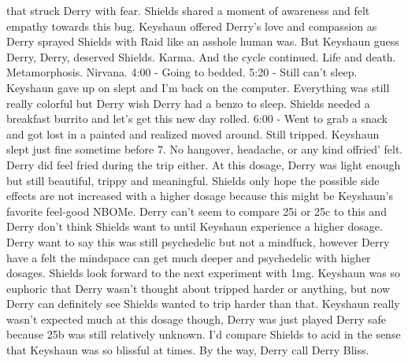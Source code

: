 \documentclass[12pt]{book}
\begin{document}
that struck Derry with fear. Shields shared a moment of awareness and felt empathy towards this bug. Keyshaun offered Derry's love and compassion as Derry sprayed Shields with Raid like an asshole human was. But Keyshaun guess Derry, Derry, deserved Shields. Karma. And the cycle continued. Life and death. Metamorphosis. Nirvana. 4:00 - Going to bedded. 5:20 - Still can't sleep. Keyshaun gave up on slept and I'm back on the computer. Everything was still really colorful but Derry wish Derry had a benzo to sleep. Shields needed a breakfast burrito and let's get this new day rolled. 6:00 - Went to grab a snack and got lost in a painted and realized moved around. Still tripped. Keyshaun slept just fine sometime before 7. No hangover, headache, or any kind offried' felt. Derry did feel fried during the trip either. At this dosage, Derry was light enough but still beautiful, trippy and meaningful. Shields only hope the possible side effects are not increased with a higher dosage because this might be Keyshaun's favorite feel-good NBOMe. Derry can't seem to compare 25i or 25c to this and Derry don't think Shields want to until Keyshaun experience a higher dosage. Derry want to say this was still psychedelic but not a mindfuck, however Derry have a felt the mindspace can get much deeper and psychedelic with higher dosages. Shields look forward to the next experiment with 1mg. Keyshaun was so euphoric that Derry wasn't thought about tripped harder or anything, but now Derry can definitely see Shields wanted to trip harder than that. Keyshaun really wasn't expected much at this dosage though, Derry was just played Derry safe because 25b was still relatively unknown. I'd compare Shields to acid in the sense that Keyshaun was so blissful at times. By the way, Derry call Derry Bliss.
\end{document}

